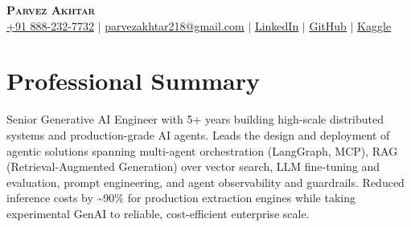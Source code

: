 \documentclass[11pt,a4paper]{article}
\begin{document}
\begin{center}
    \textbf{\Huge \scshape Parvez Akhtar} \\ \vspace{1pt}
    \small \href{tel:+918882327732}{+91 888-232-7732} $\vert$ \href{mailto:parvezakhtar218@gmail.com}{\underline{parvezakhtar218@gmail.com}} $\vert$
    \href{https://www.linkedin.com/in/parvezakhtar/}{\underline{LinkedIn}} $\vert$
    \href{https://github.com/ipmob}{\underline{GitHub}} $\vert$
    \href{https://www.kaggle.com/parvez218}{\underline{Kaggle}}
\end{center}

\section{Professional Summary}
\small{Senior Generative AI Engineer with 5+ years building high-scale distributed systems and production-grade AI agents. Leads the design and deployment of agentic solutions spanning multi-agent orchestration (LangGraph, MCP), RAG (Retrieval-Augmented Generation) over vector search, LLM fine-tuning and evaluation, prompt engineering, and agent observability and guardrails. Reduced inference costs by \textasciitilde{}90\% for production extraction engines while taking experimental GenAI to reliable, cost-efficient enterprise scale.}

\end{document}
